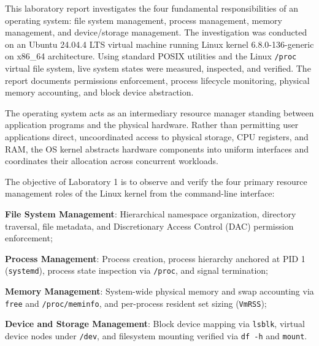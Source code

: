 \documentclass{assets/utmreport}
\begin{document}
\makeutmreporttitlepage
\tableofcontents
\clearpage

\begin{utmabstract}[Abstract]
This laboratory report investigates the four fundamental responsibilities of an operating system: file system management, process management, memory management, and device/storage management. The investigation was conducted on an Ubuntu 24.04.4 LTS virtual machine running Linux kernel 6.8.0-136-generic on x86\_64 architecture. Using standard POSIX utilities and the Linux \texttt{/proc} virtual file system, live system states were measured, inspected, and verified. The report documents permissions enforcement, process lifecycle monitoring, physical memory accounting, and block device abstraction.
\end{utmabstract}

\utmintroduction
The operating system acts as an intermediary resource manager standing between application programs and the physical hardware. Rather than permitting user applications direct, uncoordinated access to physical storage, CPU registers, and RAM, the OS kernel abstracts hardware components into uniform interfaces and coordinates their allocation across concurrent workloads.

The objective of Laboratory 1 is to observe and verify the four primary resource management roles of the Linux kernel from the command-line interface:
\begin{utmenumerate}
\item \textbf{File System Management}: Hierarchical namespace organization, directory traversal, file metadata, and Discretionary Access Control (DAC) permission enforcement;
\item \textbf{Process Management}: Process creation, process hierarchy anchored at PID 1 (\texttt{systemd}), process state inspection via \texttt{/proc}, and signal termination;
\item \textbf{Memory Management}: System-wide physical memory and swap accounting via \texttt{free} and \texttt{/proc/meminfo}, and per-process resident set sizing (\texttt{VmRSS});
\item \textbf{Device and Storage Management}: Block device mapping via \texttt{lsblk}, virtual device nodes under \texttt{/dev}, and filesystem mounting verified via \texttt{df -h} and \texttt{mount}.
\end{utmenumerate}
\end{document}
